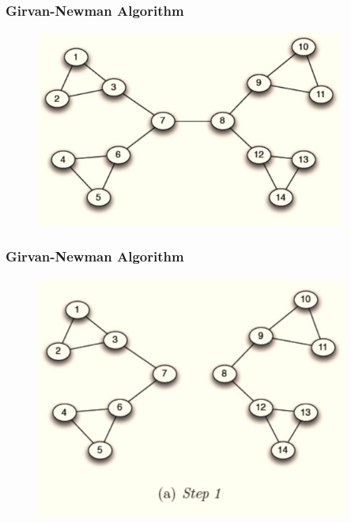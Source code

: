 \documentclass[xcolor={dvipsnames}]{beamer}
\begin{document}
{\begin{columns}
\begin{column}{.75\textwidth}

\end{column}
\end{columns}

}


\frame
{
\frametitle{Girvan-Newman Algorithm}

\vspace{-1.9em}

\begin{figure}
\includegraphics[width=4in]{stuff/gnm1.jpg}
\end{figure}

}


\frame
{
\frametitle{Girvan-Newman Algorithm}

\begin{figure}
\includegraphics[width=4.05in]{stuff/gnm2.jpg}
\end{figure}

}
\end{document}
